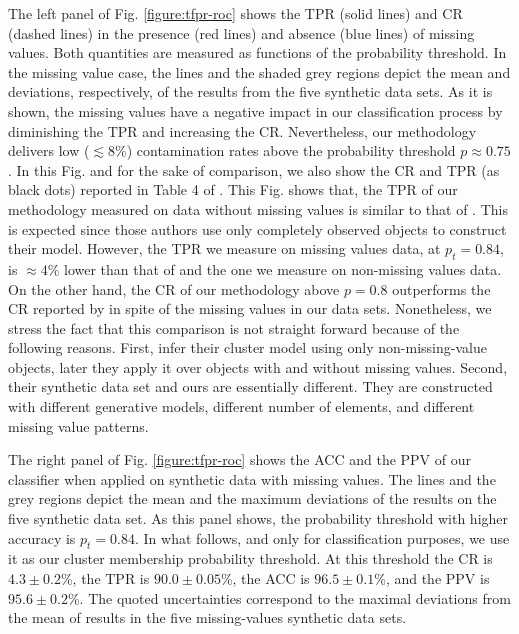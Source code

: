 The left panel of Fig. \ref{figure:tfpr-roc} shows the TPR (solid lines) and CR (dashed lines) in the presence (red lines) and absence (blue lines) of missing values. Both quantities are measured as functions of the probability threshold. In the missing value case, the lines and the shaded grey regions depict the mean and deviations, respectively, of the results from the five synthetic data sets. As it is shown, the missing values have a negative impact in our classification process by diminishing the TPR  and increasing the CR. Nevertheless, our methodology delivers low ($\lesssim 8\%$) contamination rates above the probability threshold $p \approx 0.75$. In this Fig. and for the sake of comparison, we also show the CR and TPR  (as black dots) reported in Table 4 of \citet{Sarro2014}. This Fig. shows that, the TPR of our methodology measured on data without missing values is similar to that of \citet{Sarro2014}. This is expected since those authors use only completely observed objects to construct their model. However, the TPR we measure on missing values data, at $p_t=0.84$, is $\approx 4\%$ lower than that of \citet{Sarro2014} and the one we measure on non-missing values data. On the other hand, the CR of our methodology above $p=0.8$ outperforms the CR reported by \citet{Sarro2014} in spite of the missing values in our data sets. Nonetheless, we stress the fact that this comparison is not straight forward because of the following reasons. First, \citet{Sarro2014} infer their cluster model using only non-missing-value objects, later they apply it over objects with and without missing values. Second, their synthetic data set and ours are essentially different. They are constructed with different generative models, different number of elements, and different missing value patterns. 

The right panel of Fig. \ref{figure:tfpr-roc} shows the ACC and the PPV of our classifier when applied on synthetic data with missing values. The lines and the grey regions depict the mean and the maximum deviations of the results on the five synthetic data set. As this panel shows, the probability threshold with higher accuracy is $p_t = 0.84$. In what follows, and only for classification purposes, we use it as our cluster membership probability threshold. At this threshold the CR is $4.3\pm0.2$\%, the TPR is $90.0\pm0.05$\%, the ACC is $96.5\pm0.1$\%, and the PPV is $95.6\pm0.2$\%. The quoted uncertainties correspond to the maximal deviations from the mean of results in the five missing-values synthetic data sets.

